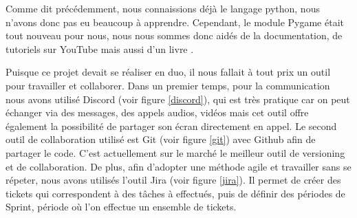 \documentclass[12pt]{article}
\begin{document}
Comme dit précédemment, nous connaissions déjà le langage python, nous n'avons donc pas eu beaucoup à apprendre. Cependant, le module Pygame était tout nouveau pour nous, nous nous sommes donc aidés de la documentation, de tutoriels sur YouTube mais aussi d'un livre \cite{prieur2019pygame}.\par
Puisque ce projet devait se réaliser en duo, il nous fallait à tout prix un outil pour travailler et collaborer. Dans un premier temps, pour la communication nous avons utilisé Discord (voir figure \ref{discord}), qui est très pratique car on peut échanger via des messages, des appels audios, vidéos mais cet outil offre également la possibilité de partager son écran directement en appel. Le second outil de collaboration utilisé est Git (voir figure \ref{git}) avec Github afin de partager le code. C'est actuellement sur le marché le meilleur outil de versioning et de collaboration. De plus, afin d'adopter une méthode agile et travailler sans se répeter, nous avons utilisés l'outil Jira (voir figure \ref{jira}). Il permet de créer des tickets qui correspondent à des tâches à effectués, puis de définir des périodes de Sprint, période où l'on effectue un ensemble de tickets.\cite{cochoy2011perlin}
\end{document}
